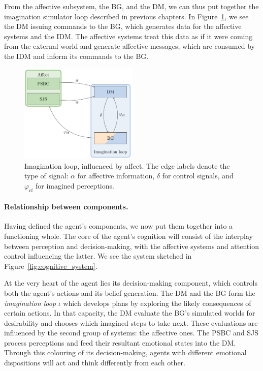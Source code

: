 From the affective subsystem, the BG, and the DM, we can thus put together the imagination simulator loop described in previous chapters. In Figure~\ref{fig:cognitive_system_dm}, we see the DM issuing commands to the BG, which generates data for the affective systems and the IDM. The affective systems treat this data as if it were coming from the external world and generate affective messages, which are consumed by the IDM and inform its commands to the BG.

\begin{figure}[t]
	\centering
	\includegraphics[width=0.5\textwidth]{Figs/Tikz/cognitive_system_dm}
	\caption{Imagination loop, influenced by affect. The edge labels denote the type of signal: $\alpha$ for affective information, $\delta$ for control signals, and $\varphi_{\mathrm{cf}}$ for imagined perceptions.}
	\label{fig:cognitive_system_dm}
\end{figure}

\paragraph{Relationship between components.} Having defined the agent's components, we now put them together into a functioning whole. The core of the agent's cognition will consist of the interplay between perception and decision-making, with the affective systems and attention control influencing the latter. We see the system sketched in Figure~\ref{fig:cognitive_system}.

At the very heart of the agent lies its decision-making component, which controls both the agent's actions and its belief generation. The DM and the BG form the {\em imagination loop} $\iota$ which develops plans by exploring the likely consequences of certain actions. In that capacity, the DM evaluate the BG's simulated worlds for desirability and chooses which imagined steps to take next. These evaluations are influenced by the second group of systems: the affective ones. The PSBC and SJS process perceptions and feed their resultant emotional states into the DM. Through this colouring of its decision-making, agents with different emotional dispositions will act and think differently from each other.

